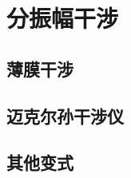

\section{分振幅干涉}\label{25-3}

\subsection{薄膜干涉}\label{25-3-1}

\subsection{迈克尔孙干涉仪}\label{25-3-2}

\subsection{其他变式}\label{25-3-3}
